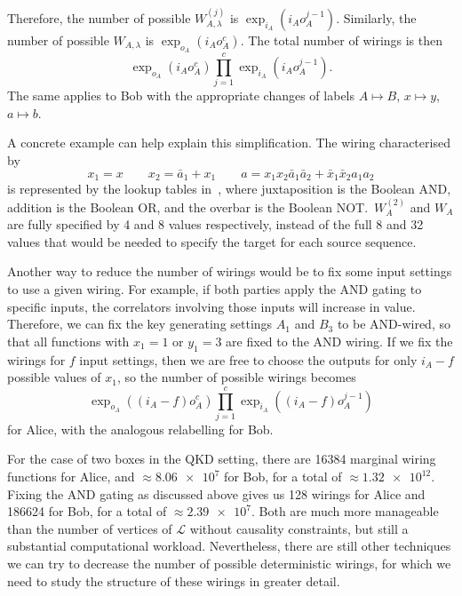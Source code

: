 \documentclass[10pt, a4paper]{article}
\numberwithin{equation}{section} %
\theoremstyle{definition}
\theoremstyle{plain}
\newcommand{\?}{\mathrel{?}} %
\newcommand{\Ls}{\mathcal{L}}
\begin{document}
      Therefore, the number of possible \(W^{(j)}_{A,\lambda}\) is \(\exp_{i_A}(i_A o_A^{j-1})\). Similarly, the number of possible \(W_{A,\lambda}\) is \(\exp_{o_A}(i_A o_A^{c})\). The total number of wirings is then
      \begin{equation}
        \exp_{o_A}(i_A o_A^c) \prod_{j=1}^c \exp_{i_A}(i_A o_A^{j-1}).
      \end{equation}
      The same applies to Bob with the appropriate changes of labels \(A \mapsto B\), \(x \mapsto y\), \(a \mapsto b\). 

      A concrete example can help explain this simplification. The wiring characterised by
      \begin{equation}
        x_1 = x \qquad x_2 = \bar{a}_1 + x_1 \qquad a = x_1x_2\bar{a}_1\bar{a}_2 + \bar{x}_1\bar{x}_2a_1a_2\label{eqn:wiringeg}
      \end{equation}
      is represented by the lookup tables in~, where juxtaposition is the Boolean AND, addition is the Boolean OR, and the overbar is the Boolean NOT.\ \(W_A^{(2)}\) and \(W_A\) are fully specified by 4 and 8 values respectively, instead of the full 8 and 32 values that would be needed to specify the target for each source sequence.

      Another way to reduce the number of wirings would be to fix some input settings to use a given wiring. For example, if both parties apply the AND gating to specific inputs, the correlators involving those inputs will increase in value. Therefore, we can fix the key generating settings \(A_1\) and \(B_3\) to be AND-wired, so that all functions with \(x_1 = 1\) or \(y_1 = 3\) are fixed to the AND wiring. If we fix the wirings for \(f\) input settings, then we are free to choose the outputs for only \(i_A - f\) possible values of \(x_1\), so the number of possible wirings becomes
      \begin{equation}
        \exp_{o_A}((i_A-f) o_A^c) \prod_{j=1}^c \exp_{i_A}((i_A-f) o_A^{j-1})
      \end{equation}
      for Alice, with the analogous relabelling for Bob.

      For the case of two boxes in the QKD setting, there are 16384 marginal wiring functions for Alice, and \(\approx \num{8.06e7}\) for Bob, for a total of \(\approx \num{1.32e12}\). Fixing the AND gating as discussed above gives us 128 wirings for Alice and 186624 for Bob, for a total of \(\approx \num{2.39e7}\). Both are much more manageable than the number of vertices of \(\Ls\) without causality constraints, but still a substantial computational workload. Nevertheless, there are still other techniques we can try to decrease the number of possible deterministic wirings, for which we need to study the structure of these wirings in greater detail.
\end{document}
